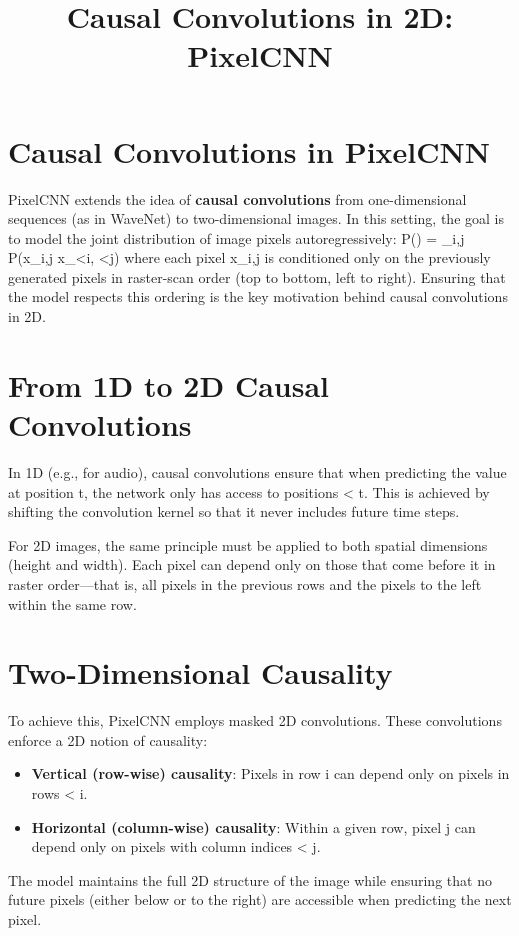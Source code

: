\documentclass[11pt,a4paper]{article}
\title{Causal Convolutions in 2D: PixelCNN}
\author{}
\date{}
\begin{document}
\maketitle

\section*{Causal Convolutions in PixelCNN}

PixelCNN extends the idea of \textbf{causal convolutions} from one-dimensional sequences (as in WaveNet) to two-dimensional images. In this setting, the goal is to model the joint distribution of image pixels autoregressively:
P() = \prod_{i,j} P(x_{i,j} \mid x_{<i, <j})
where each pixel x_{i,j} is conditioned only on the previously generated pixels in raster-scan order (top to bottom, left to right). Ensuring that the model respects this ordering is the key motivation behind causal convolutions in 2D.

\section*{From 1D to 2D Causal Convolutions}
In 1D (e.g., for audio), causal convolutions ensure that when predicting the value at position t, the network only has access to positions < t. This is achieved by shifting the convolution kernel so that it never includes future time steps.

For 2D images, the same principle must be applied to both spatial dimensions (height and width). Each pixel can depend only on those that come before it in raster order—that is, all pixels in the previous rows and the pixels to the left within the same row.

\section*{Two-Dimensional Causality}
To achieve this, PixelCNN employs masked 2D convolutions. These convolutions enforce a 2D notion of causality:
\begin{itemize}
\item \textbf{Vertical (row-wise) causality}: Pixels in row i can depend only on pixels in rows < i.
\item \textbf{Horizontal (column-wise) causality}: Within a given row, pixel j can depend only on pixels with column indices < j.
\end{itemize}

The model maintains the full 2D structure of the image while ensuring that no future pixels (either below or to the right) are accessible when predicting the next pixel.
\end{document}
